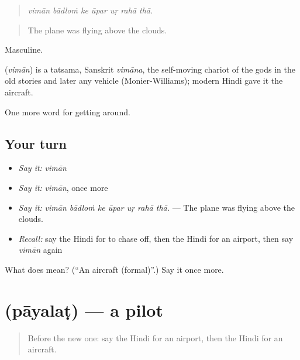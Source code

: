 \begin{quote}
\emph{vimān bādloṁ ke ūpar uṛ rahā thā.}
\end{quote}

\begin{quote}
The plane was flying above the clouds.
\end{quote}

Masculine.

\begin{cousinweb}
\textbf{} (\emph{vimān}) is a tatsama, Sanskrit \emph{vimāna}, the self-moving chariot of the gods in the old stories and later any vehicle (Monier-Williams); modern Hindi gave it the aircraft.
\end{cousinweb}

\begin{grammarlens}[title={What you've built}]
One more word for getting around.
\end{grammarlens}

\subsection*{Your turn}
\begin{itemize}
\raggedright
  \item \emph{Say it:} \emph{vimān}
  \item \emph{Say it:} \emph{vimān}, once more
  \item \emph{Say it:} \emph{vimān bādloṁ ke ūpar uṛ rahā thā.} — The plane was flying above the clouds.
  \item \emph{Recall:} say the Hindi for to chase off, then the Hindi for an airport, then say \emph{vimān} again
\end{itemize}

\begin{tcolorbox}[breakable,colback=teal!4,colframe=teal!35!black,title={Before you move on}]
What does  mean? (\textquotedblleft{}An aircraft (formal)\textquotedblright{}.) Say it once more.
\end{tcolorbox}
\section[\texorpdfstring{\hi{पायलट} (pāyalaṭ)}{पायलट (pāyalaṭ)}]{ (pāyalaṭ) — a pilot}

\label{lesson:HI-C409-payalat}



\begin{quote}
Before the new one: say the Hindi for an airport, then the Hindi for an aircraft.
\end{quote}

